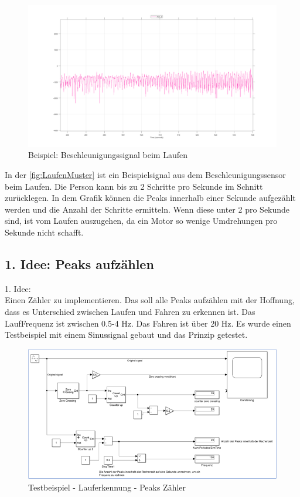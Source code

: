 \begin{figure}[H]
	\centering
	\includegraphics[width=\linewidth]{Bilder/LaufenMuster.png}
	\caption{Beispiel: Beschleunigungssignal beim Laufen}
	\label{fig:LaufenMuster}
\end{figure}
In der \autoref{fig:LaufenMuster} ist ein Beispielsignal aus dem Beschleunigungssensor beim Laufen. Die Person kann bis zu 2 Schritte pro Sekunde im Schnitt zurücklegen. In dem Grafik können die Peaks innerhalb einer Sekunde aufgezählt werden und die Anzahl der Schritte ermitteln. Wenn diese unter 2 pro Sekunde sind, ist vom Laufen auszugehen, da ein Motor so wenige Umdrehungen pro Sekunde nicht schafft.
%
\subsection{1. Idee: Peaks aufzählen} %
1. Idee:\\

Einen Zähler zu implementieren. Das soll alle Peaks aufzählen mit der Hoffnung, dass es Unterschied zwischen Laufen und Fahren zu erkennen ist.
Das LaufFrequenz ist zwischen 0.5-4 Hz. Das Fahren ist über 20 Hz.
Es wurde einen Testbeispiel mit einem Sinussignal gebaut und das Prinzip getestet.
\begin{figure}[H]
	\centering
	\includegraphics[width=\linewidth]{Bilder/Lauferkennung_Peaks_Testbeispiel.png}
	\caption{Testbeispiel - Lauferkennung - Peaks Zähler}
	\label{fig:Lauferkennung_Peaks_Testbeispiel}
\end{figure}

